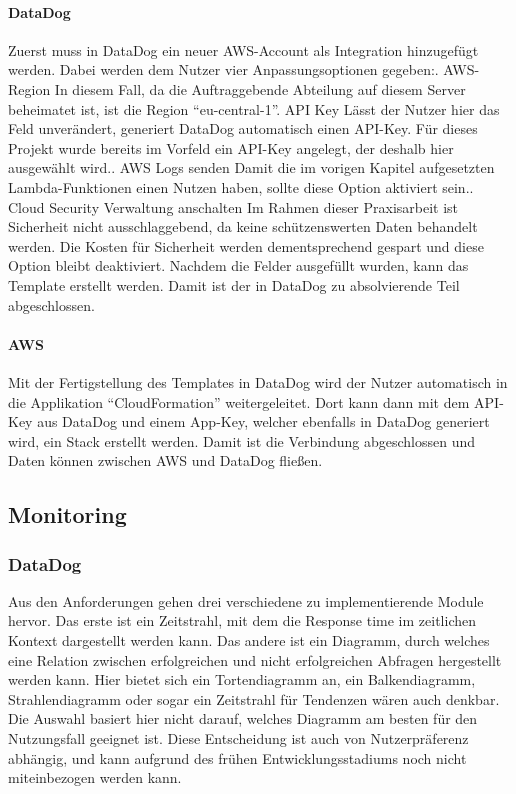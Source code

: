 \paragraph{DataDog}
Zuerst muss in DataDog ein neuer AWS-Account als Integration hinzugefügt werden. Dabei werden dem Nutzer vier Anpassungsoptionen gegeben:. AWS-Region\newline
In diesem Fall, da die Auftraggebende Abteilung auf diesem Server beheimatet ist, ist die Region ``eu-central-1''. API Key\newline
Lässt der Nutzer hier das Feld unverändert, generiert DataDog automatisch einen API-Key. Für dieses Projekt wurde bereits im Vorfeld ein API-Key angelegt, der deshalb hier ausgewählt wird.. AWS Logs senden\newline
Damit die im vorigen Kapitel aufgesetzten Lambda-Funktionen einen Nutzen haben, sollte diese Option aktiviert sein.. Cloud Security Verwaltung anschalten\newline
Im Rahmen dieser Praxisarbeit ist Sicherheit nicht ausschlaggebend, da keine schützenswerten Daten behandelt werden. Die Kosten für Sicherheit werden dementsprechend gespart und diese Option bleibt deaktiviert.\newline
\newline
Nachdem die Felder ausgefüllt wurden, kann das Template erstellt werden. Damit ist der in DataDog zu absolvierende Teil abgeschlossen. \newline
\paragraph{AWS}
Mit der Fertigstellung des Templates in DataDog wird der Nutzer automatisch in die Applikation ``CloudFormation'' weitergeleitet. Dort kann dann mit dem API-Key aus DataDog und einem App-Key, welcher ebenfalls in DataDog generiert wird, ein Stack erstellt werden. Damit ist die Verbindung abgeschlossen und Daten können zwischen AWS und DataDog fließen.

\subsection{Monitoring}
\subsubsection{DataDog}
Aus den Anforderungen gehen drei verschiedene zu implementierende Module hervor. Das erste ist ein Zeitstrahl, mit dem die Response time im zeitlichen Kontext dargestellt werden kann.  Das andere ist ein Diagramm, durch welches eine Relation zwischen erfolgreichen und nicht erfolgreichen Abfragen hergestellt werden kann. Hier bietet sich ein Tortendiagramm an, ein Balkendiagramm, Strahlendiagramm oder sogar ein Zeitstrahl für Tendenzen wären auch denkbar. Die Auswahl basiert hier nicht darauf, welches Diagramm am besten für den Nutzungsfall geeignet ist. Diese Entscheidung ist auch von Nutzerpräferenz abhängig, und kann aufgrund des frühen Entwicklungsstadiums noch nicht miteinbezogen werden kann.

